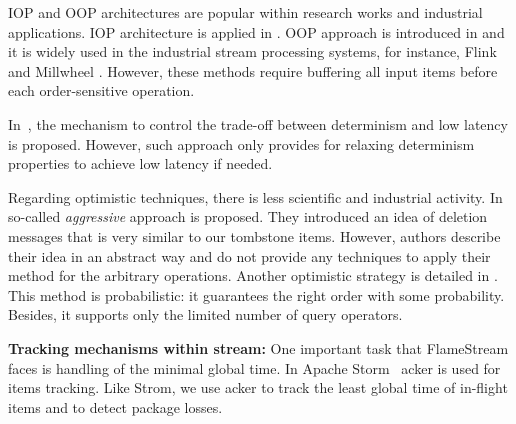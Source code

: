 IOP and OOP architectures are popular within research works and industrial applications. IOP architecture is applied in \cite{Cranor:2003:GSD:872757.872838, Arasu:2006:CCQ:1146461.1146463}. OOP approach is introduced in \cite{Li:2008:OPN:1453856.1453890} and it is widely used in the industrial stream processing systems, for instance, Flink \cite{carbone2015apache} and Millwheel \cite{Akidau:2013:MFS:2536222.2536229}. However, these methods require buffering all input items before each order-sensitive operation.

In~\cite{Zacheilas:2017:MDS:3093742.3093921}, the mechanism to control the trade-off between determinism and low latency is proposed. However, such approach only provides for relaxing determinism properties to achieve low latency if needed.

Regarding optimistic techniques, there is less scientific and industrial activity. In \cite{Wei:2009:SSO:1559845.1559973} so-called {\it aggressive} approach is proposed. They introduced an idea of deletion messages that is very similar to our tombstone items. However, authors describe their idea in an abstract way and do not provide any techniques to apply their method for the arbitrary operations. Another optimistic strategy is detailed in \cite{Li2011}. This method is probabilistic: it guarantees the right order with some probability. Besides, it supports only the limited number of query operators.

{\bf Tracking mechanisms within stream:}
One important task that FlameStream faces is handling of the minimal global time. In Apache Storm~\cite{apache:storm} acker is used for items tracking. Like Strom, we use acker to track the least global time of in-flight items and to detect package losses.
